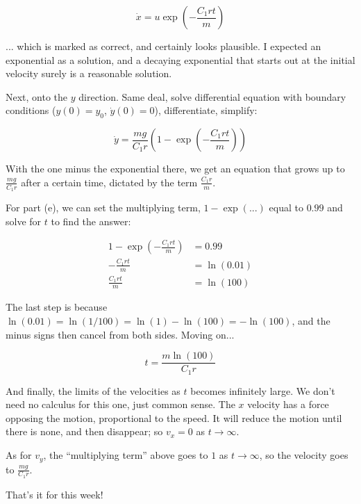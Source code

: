 \documentclass[8.01x]{subfiles}
\begin{document}
\begin{equation}
\dot{x} = u \exp\left(-\frac{C_1 r t}{m}\right)
\end{equation}

... which is marked as correct, and certainly looks plausible. I expected an exponential as a solution, and a decaying exponential that starts out at the initial velocity surely is a reasonable solution.

Next, onto the $y$ direction. Same deal, solve differential equation with boundary conditions ($y(0) = y_0$, $\dot{y}(0) = 0$), differentiate, simplify:

\begin{equation}
\dot{y} = \frac{m g}{C_1 r} \left(1 - \exp\left(-\frac{C_1 r t}{m}\right) \right)
\end{equation}

With the one minus the exponential there, we get an equation that grows up to $\displaystyle \frac{m g}{C_1 r}$ after a certain time, dictated by the term $\displaystyle \frac{C_1 r}{m}$.

For part (e), we can set the multiplying term, $1 - \exp(...)$ equal to $0.99$ and solve for $t$ to find the answer:

\begin{align}
1 - \exp\left(-\frac{C_1 r t}{m}\right) &= 0.99\\
-\frac{C_1 r t}{m} &= \ln(0.01)\\
\frac{C_1 r t}{m} &= \ln(100) 
\end{align}

The last step is because $\ln(0.01) = \ln(1/100) = \ln (1) - \ln(100) = -\ln(100)$, and the minus signs then cancel from both sides. Moving on...

\begin{equation}
t = \frac{m \ln(100)}{C_1 r}
\end{equation}

And finally, the limits of the velocities as $t$ becomes infinitely large. We don't need no calculus for this one, just common sense. The $x$ velocity has a force opposing the motion, proportional to the speed. It will reduce the motion until there is none, and then disappear; so $v_x = 0$ as $t \to \infty$.

As for $v_y$, the ``multiplying term'' above goes to $1$ as $t \to \infty$, so the velocity goes to $\displaystyle \frac{m g}{C_1 r}$.

That's it for this week!
\end{document}
